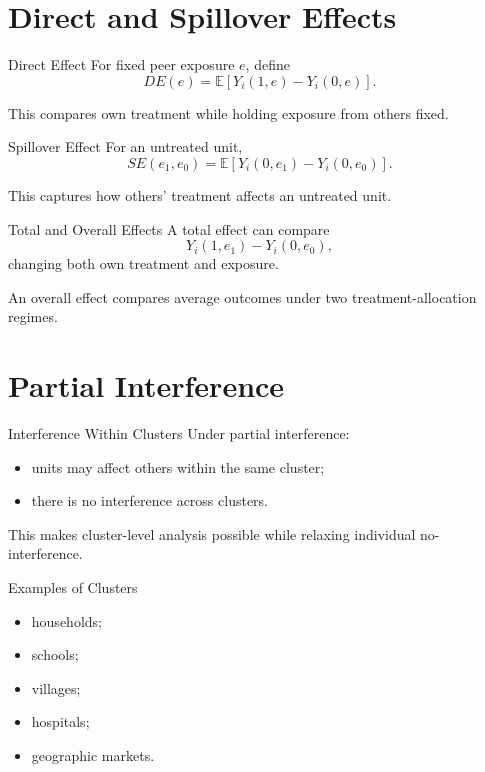 \documentclass[aspectratio=169,11pt]{beamer}
\begin{document}
\section{Direct and Spillover Effects}

\begin{frame}{Direct Effect}
For fixed peer exposure \(e\), define
\[
DE(e)
=
\mathbb E\left[
Y_i(1,e)-Y_i(0,e)
\right].
\]

This compares own treatment while holding exposure from others fixed.
\end{frame}

\begin{frame}{Spillover Effect}
For an untreated unit,
\[
SE(e_1,e_0)
=
\mathbb E\left[
Y_i(0,e_1)-Y_i(0,e_0)
\right].
\]

This captures how others' treatment affects an untreated unit.
\end{frame}

\begin{frame}{Total and Overall Effects}
A total effect can compare
\[
Y_i(1,e_1)-Y_i(0,e_0),
\]
changing both own treatment and exposure.

An overall effect compares average outcomes under two treatment-allocation regimes.
\end{frame}

\section{Partial Interference}

\begin{frame}{Interference Within Clusters}
Under partial interference:
\begin{itemize}
\item units may affect others within the same cluster;
\item there is no interference across clusters.
\end{itemize}

This makes cluster-level analysis possible while relaxing individual no-interference.
\end{frame}

\begin{frame}{Examples of Clusters}
\begin{itemize}
\item households;
\item schools;
\item villages;
\item hospitals;
\item geographic markets.
\end{itemize}
\end{frame}
\end{document}
